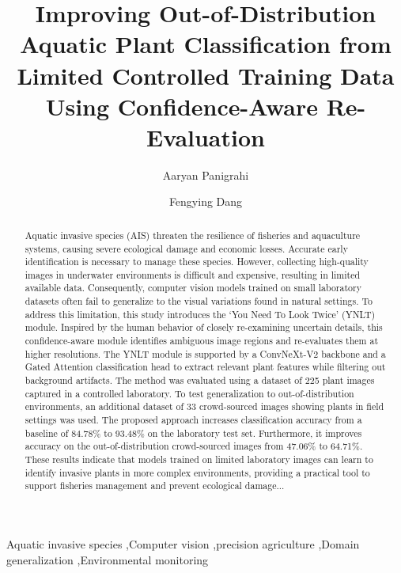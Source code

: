 \documentclass[final,3p,times,twocolumn]{elsarticle}
\begin{document}
\begin{frontmatter}

\title{Improving Out-of-Distribution Aquatic Plant Classification from Limited Controlled Training Data Using Confidence-Aware Re-Evaluation}

\author[label1]{Aaryan Panigrahi}
\author[label1]{Fengying Dang}


\address{Fengying Dang (fdang1@mtu.edu) is the corresponding author}
\address[label1]{Department of Electrical and Computer Engineering, Michigan Technological University, Houghton, MI 49931, USA}


\begin{abstract}
Aquatic invasive species (AIS) threaten the resilience of fisheries and aquaculture systems, causing severe ecological damage and economic losses. Accurate early identification is necessary to manage these species. However, collecting high-quality images in underwater environments is difficult and expensive, resulting in limited available data. Consequently, computer vision models trained on small laboratory datasets often fail to generalize to the visual variations found in natural settings. To address this limitation, this study introduces the `You Need To Look Twice' (YNLT) module. Inspired by the human behavior of closely re-examining uncertain details, this confidence-aware module identifies ambiguous image regions and re-evaluates them at higher resolutions. The YNLT module is supported by a ConvNeXt-V2 backbone and a Gated Attention classification head to extract relevant plant features while filtering out background artifacts. The method was evaluated using a dataset of 225 plant images captured in a controlled laboratory. To test generalization to out-of-distribution environments, an additional dataset of 33 crowd-sourced images showing plants in field settings was used. The proposed approach increases classification accuracy from a baseline of 84.78\% to 93.48\% on the laboratory test set. Furthermore, it improves accuracy on the out-of-distribution crowd-sourced images from 47.06\% to 64.71\%. These results indicate that models trained on limited laboratory images can learn to identify invasive plants in more complex environments, providing a practical tool to support fisheries management and prevent ecological damage...
\end{abstract}

\begin{keyword}
Aquatic invasive species \sep Computer vision \sep precision agriculture \sep Domain generalization \sep Environmental monitoring
\end{keyword}

\end{frontmatter}
\end{document}
